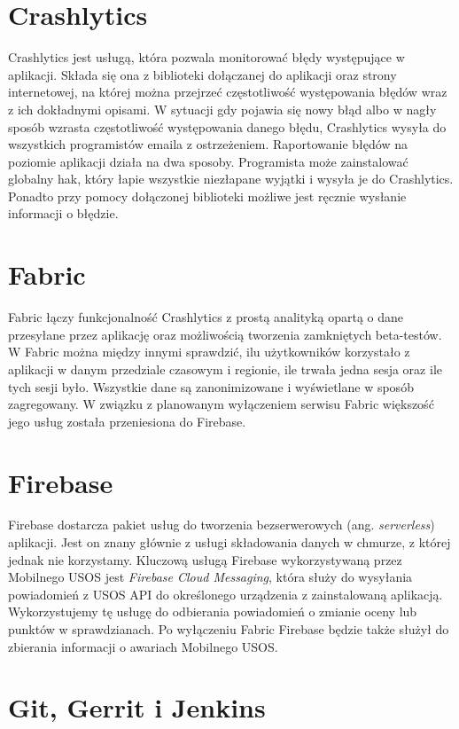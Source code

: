 \documentclass{pracamgr}
\begin{document}
\section{Crashlytics}

Crashlytics jest usługą, która pozwala monitorować błędy występujące w aplikacji.
Składa się ona z biblioteki dołączanej do aplikacji oraz strony internetowej,
na której można przejrzeć częstotliwość występowania błędów wraz z ich dokładnymi
opisami. W sytuacji gdy pojawia się nowy błąd albo w nagły sposób wzrasta częstotliwość
występowania danego błędu, Crashlytics wysyła do wszystkich programistów emaila
z ostrzeżeniem. Raportowanie błędów na poziomie aplikacji działa na dwa sposoby.
Programista może zainstalować globalny hak, który łapie wszystkie niezłapane
wyjątki i wysyła je do Crashlytics. Ponadto przy pomocy dołączonej biblioteki
możliwe jest ręcznie wysłanie informacji o błędzie.

\section{Fabric}

Fabric łączy funkcjonalność Crashlytics z prostą analityką opartą o dane przesyłane
przez aplikację oraz możliwością tworzenia zamkniętych beta-testów. W Fabric można
między innymi sprawdzić, ilu użytkowników korzystało z aplikacji w danym przedziale
czasowym i regionie, ile trwała jedna sesja oraz ile tych sesji było. Wszystkie
dane są zanonimizowane i wyświetlane w sposób zagregowany. W związku z planowanym
wyłączeniem serwisu Fabric większość jego usług została przeniesiona do Firebase.

\section{Firebase}

Firebase dostarcza pakiet usług do tworzenia bezserwerowych (ang.
\textit{serverless}) aplikacji. Jest on znany głównie z usługi składowania
danych w chmurze, z której jednak nie korzystamy. Kluczową usługą Firebase
wykorzystywaną przez Mobilnego USOS jest \textit{Firebase Cloud Messaging},
która służy do wysyłania powiadomień z USOS API do określonego urządzenia z
zainstalowaną aplikacją. Wykorzystujemy tę usługę do odbierania powiadomień o
zmianie oceny lub punktów w sprawdzianach. Po wyłączeniu Fabric Firebase będzie
także służył do zbierania informacji o awariach Mobilnego USOS.

\section{Git, Gerrit i Jenkins}
\end{document}
